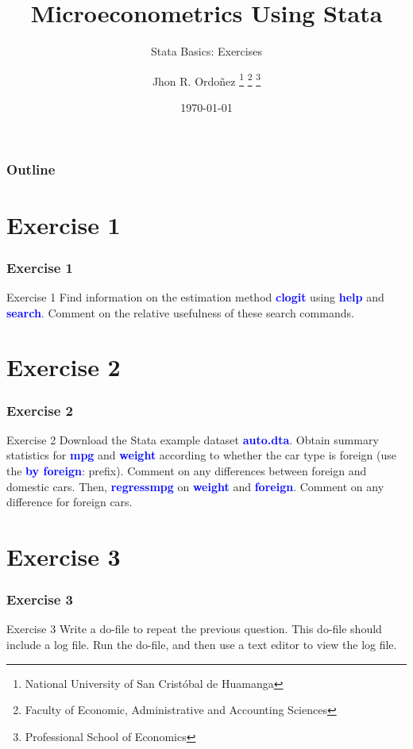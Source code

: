 \documentclass[11pt, aspectratio=169]{beamer}
\title{Microeconometrics Using Stata}
\subtitle{Stata Basics: Exercises}
\author{
		Jhon R. Ordoñez
		\footnote{\label{1} National University of San Cristóbal de Huamanga}
		\footnote{\label{2} Faculty of Economic, Administrative and Accounting Sciences}
		\footnote{\label{3} Professional School of Economics}
	}
\date{\today}
\begin{document}
	\begin{frame}
		\maketitle
	\end{frame}
	\begin{frame}[t]
		\frametitle{Outline}
			\tableofcontents
	\end{frame}
	\section{Exercise 1}
		\begin{frame}
			\frametitle{Exercise 1}
				\begin{block}{Exercise 1}
					Find information on the estimation method \textcolor{blue}{\textbf{clogit}} using \textcolor{blue}{\textbf{help}} and
					\textcolor{blue}{\textbf{search}}. Comment on the relative usefulness of these search commands.
				\end{block}
		\end{frame}
	\section{Exercise 2}
		\begin{frame}
			\frametitle{Exercise 2}
			\begin{block}{Exercise 2}
				Download the Stata example dataset \textcolor{blue}{\textbf{auto.dta}}. Obtain summary
				statistics for \textcolor{blue}{\textbf{mpg}} and \textcolor{blue}{\textbf{weight}} according 
				to whether the car type is foreign (use the \textcolor{blue}{\textbf{by foreign}}: prefix). Comment on any differences
				between foreign and domestic cars. Then, \textcolor{blue}{\textbf{regressmpg}} on \textcolor{blue}{\textbf{weight}} and
				\textcolor{blue}{\textbf{foreign}}. Comment on any difference for foreign cars.
			\end{block}
		\end{frame}
	\section{Exercise 3}
		\begin{frame}
			\frametitle{Exercise 3}
			\begin{block}{Exercise 3}
				Write a do-file to repeat the previous question. This do-file should
				include a log file. Run the do-file, and then use a text editor to view the
				log file.
			\end{block}
		\end{frame}
\end{document}

